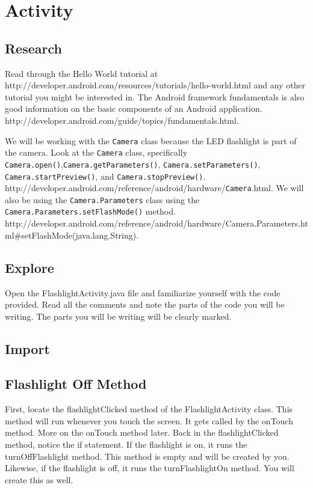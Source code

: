 \section{Activity}

\subsection{Research}
Read through the Hello World tutorial at http://developer.android.com/resources/tutorials/hello-world.html and any other tutorial you might be interested in. 
The Android framework fundamentals is also good information on the basic components of an Android application. http://developer.android.com/guide/topics/fundamentals.html.

We will be working with the \verb=Camera= class because the LED flashlight is part of the camera. 
Look at the \verb=Camera= class, specifically \verb=Camera.open()=,\verb=Camera.getParameters()=, \verb=Camera.setParameters()=, \verb=Camera.startPreview()=, and \verb=Camera.stopPreview()=. http://developer.android.com/reference/android/hardware/\verb=Camera=.html.
We will also be using the \verb=Camera.Parameters= class using the \verb=Camera.Parameters.setFlashMode()= method. http://developer.android.com/reference/android/hardware/Camera.Parameters.html\#setFlashMode(java.lang.String).

\subsection{Explore}
Open the FlashlightActivity.java file and familiarize yourself with the code provided. 
Read all the comments and note the parts of the code you will be writing. 
The parts you will be writing will be clearly marked.

\subsection{Import}

\subsection{Flashlight Off Method}
First, locate the flashlightClicked method of the FlashlightActivity class. 
This method will run whenever you touch the screen. 
It gets called by the onTouch method. 
More on the onTouch method later. 
Back in the flashlightClicked method, notice the if statement. 
If the flashlight is on, it runs the turnOffFlashlight method. 
This method is empty and will be created by you. 
Likewise, if the flashlight is off, it runs the turnFlashlightOn method. 
You will create this as well.

